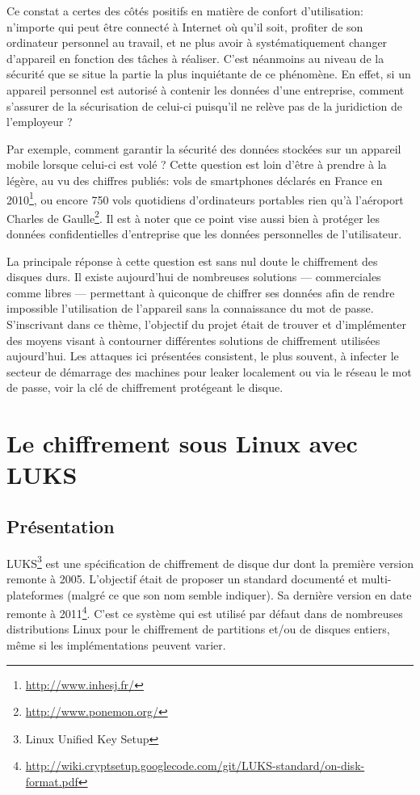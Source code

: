 \documentclass[12pt,a4paper]{article}
\begin{document}
Ce constat a certes des côtés positifs en matière de confort d'utilisation: n'importe qui peut être connecté à Internet où qu'il soit, profiter de son ordinateur personnel au travail, et ne plus avoir à systématiquement changer d'appareil en fonction des tâches à réaliser. C'est néanmoins au niveau de la sécurité que se situe la partie la plus inquiétante de ce phénomène. En effet, si un appareil personnel est autorisé à contenir les données d'une entreprise, comment s'assurer de la sécurisation de celui-ci puisqu'il ne relève pas de la juridiction de l'employeur ? 

Par exemple, comment garantir la sécurité des données stockées sur un appareil mobile lorsque celui-ci est volé ? Cette question est loin d'être à prendre à la légère, au vu des chiffres publiés:  vols de smartphones déclarés en France en 2010\footnote{\url{http://www.inhesj.fr/}}, ou encore 750 vols quotidiens d'ordinateurs portables rien qu'à l'aéroport Charles de Gaulle\footnote{\url{http://www.ponemon.org/}}. Il est à noter que ce point vise aussi bien à protéger les données confidentielles d'entreprise que les données personnelles de l'utilisateur.

La principale réponse à cette question est sans nul doute le chiffrement des disques durs. Il existe aujourd'hui de nombreuses solutions --- commerciales comme libres --- permettant à quiconque de chiffrer ses données afin de rendre impossible l'utilisation de l'appareil sans la connaissance du mot de passe.\\

S'inscrivant dans ce thème, l'objectif du projet était de trouver et d'implémenter des moyens visant à contourner différentes solutions de chiffrement utilisées aujourd'hui. Les attaques ici présentées consistent, le plus souvent, à infecter le secteur de démarrage des machines pour leaker localement ou via le réseau le mot de passe, voir la clé de chiffrement protégeant le disque.


\newpage
\section{Le chiffrement sous Linux avec LUKS}

\subsection{Présentation}

LUKS\footnote{Linux Unified Key Setup} est une spécification de chiffrement de disque dur dont la première version remonte à 2005. L'objectif était de proposer un standard documenté et multi-plateformes (malgré ce que son nom semble indiquer). Sa dernière version en date remonte à 2011\footnote{\url{http://wiki.cryptsetup.googlecode.com/git/LUKS-standard/on-disk-format.pdf}}. C'est ce système qui est utilisé par défaut dans de nombreuses distributions Linux pour le chiffrement de partitions et/ou de disques entiers, même si les implémentations peuvent varier.
\end{document}
